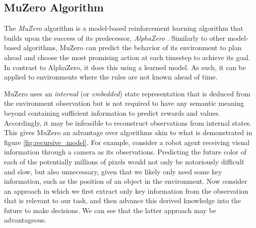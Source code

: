 \newcommand{\policy}{\text{\textbf{p}}}
\newcommand{\svalue}{\mathfrak{v}}

\subsection{MuZero Algorithm}
The \textit{MuZero} algorithm \cite{muzero} is a model-based reinforcement learning algorithm that builds upon the success of its predecessor, \textit{AlphaZero} \cite{alphazero}. Similarly to other model-based algorithms, MuZero can predict the behavior of its environment to plan ahead and choose the most promising action at each timestep to achieve its goal. In contrast to AlphaZero, it does this using a learned model. As such, it can be applied to environments where the rules are not known ahead of time.

MuZero uses an \textit{internal} (or \textit{embedded}) state representation that is deduced from the environment observation but is not required to have any semantic meaning beyond containing sufficient information to predict rewards and values. Accordingly, it may be infeasible to reconstruct observations from internal states. This gives MuZero an advantage over algorithms akin to what is demonstrated in figure \ref{fig:recursive_model}. For example, consider a robot agent receiving visual information through a camera as its observations. Predicting the future color of each of the potentially millions of pixels would not only be notoriously difficult and slow, but also unnecessary, given that we likely only need some key information, such as the position of an object in the environment. Now consider an approach in which we first extract only key information from the observation that is relevant to our task, and then advance this derived knowledge into the future to make decisions. We can see that the latter approach may be advantageous.

